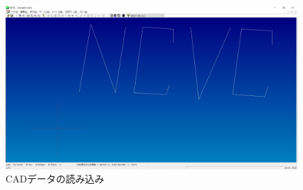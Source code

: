 \begin{figure}[H]
\centering
\includegraphics[scale=0.4]{No1/fig/NCVCread.png}
\caption{CADデータの読み込み}
\label{fig:NCVCread.png}
\end{figure}
